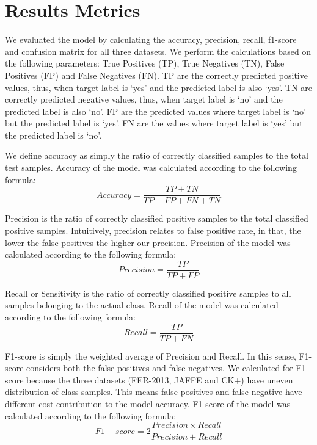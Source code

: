 \documentclass[master]{thesis-uestc}
\begin{document}
\section{Results Metrics}
We evaluated the model by calculating the accuracy, precision, recall, f1-score and confusion matrix \cite{FAWCETT2006861} for all three datasets. We perform the calculations based on the following parameters: True Positives (TP), True Negatives (TN), False Positives (FP) and False Negatives (FN). TP are the correctly predicted positive values, thus, when target label is `yes' and the predicted label is also `yes'. TN are correctly predicted negative values, thus, when target label is `no' and the predicted label is also `no'. FP are the predicted values where target label is `no' but the predicted label is `yes'. FN are the values where target label is `yes' but the predicted label is `no'.

We define accuracy as simply the ratio of correctly classified samples to the total test samples. Accuracy of the model was calculated according to the following formula:
\begin{equation}
Accuracy=\frac{TP + TN}
 {TP + FP + FN + TN}
\end{equation}

Precision is the ratio of correctly classified positive samples to the total classified positive samples. Intuitively, precision relates to false positive rate, in that, the lower the false positives the higher our precision. Precision of the model was calculated according to the following formula:
\begin{equation}
Precision=\frac{TP}
 {TP + FP}
\end{equation}

Recall or Sensitivity is the ratio of correctly classified positive samples to all samples belonging to the actual class. Recall of the model was calculated according to the following formula:
\begin{equation}
Recall=\frac{TP}
 {TP + FN}
\end{equation}

F1-score is simply the weighted average of Precision and Recall. In this sense, F1-score considers both the false positives and false negatives. We calculated for F1-score because the three datasets (FER-2013, JAFFE and CK+) have uneven distribution of class samples. This means false positives and false negative have different cost contribution to the model accuracy. F1-score of the model was calculated according to the following formula:
\begin{equation}
F1-score=2\frac{Precision \times Recall}
 {Precision + Recall}
\end{equation}
\end{document}
